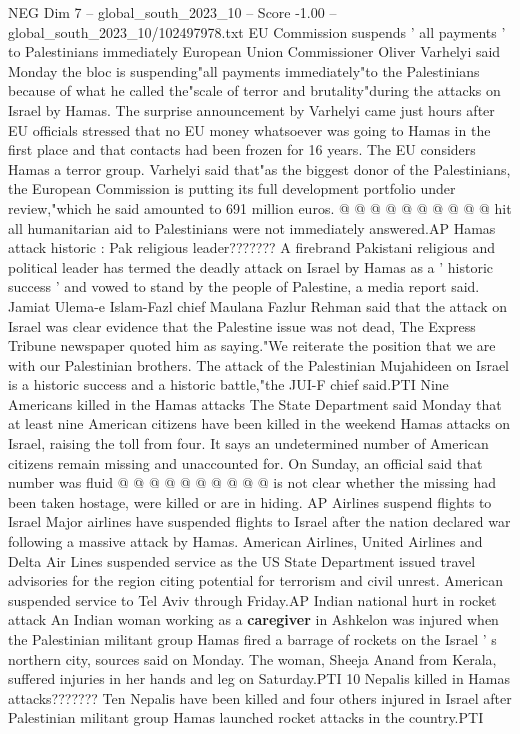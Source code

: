 \begin{textsample}{NEG Dim 7 – global\_south\_2023\_10 – Score -1.00 – global\_south\_2023\_10/102497978.txt}
EU Commission suspends ' all payments ' to Palestinians immediately European Union Commissioner Oliver Varhelyi said Monday the bloc is suspending"all payments immediately"to the Palestinians because of what he called the"scale of terror and brutality"during the attacks on Israel by Hamas.
The surprise announcement by Varhelyi came just hours after EU officials stressed that no EU money whatsoever was going to Hamas in the first place and that contacts had been frozen for 16 years.
The EU considers Hamas a terror group.
Varhelyi said that"as the biggest donor of the Palestinians, the European Commission is putting its full development portfolio under review,"which he said amounted to 691 million euros. @ @ @ @ @ @ @ @ @ @ hit all humanitarian aid to Palestinians were not immediately answered.AP Hamas attack historic : Pak religious leader???????
A firebrand Pakistani religious and political leader has termed the deadly attack on Israel by Hamas as a ' historic success ' and vowed to stand by the people of Palestine, a media report said.
Jamiat Ulema-e Islam-Fazl chief Maulana Fazlur Rehman said that the attack on Israel was clear evidence that the Palestine issue was not dead, The Express Tribune newspaper quoted him as saying."We reiterate the position that we are with our Palestinian brothers.
The attack of the Palestinian Mujahideen on Israel is a historic success and a historic battle,"the JUI-F chief said.PTI Nine Americans killed in the Hamas attacks The State Department said Monday that at least nine American citizens have been killed in the weekend Hamas attacks on Israel, raising the toll from four.
It says an undetermined number of American citizens remain missing and unaccounted for.
On Sunday, an official said that number was fluid @ @ @ @ @ @ @ @ @ @ is not clear whether the missing had been taken hostage, were killed or are in hiding.
AP Airlines suspend flights to Israel Major airlines have suspended flights to Israel after the nation declared war following a massive attack by Hamas.
American Airlines, United Airlines and Delta Air Lines suspended service as the US State Department issued travel advisories for the region citing potential for terrorism and civil unrest.
American suspended service to Tel Aviv through Friday.AP Indian national hurt in rocket attack An Indian woman working as a \textbf{caregiver} in Ashkelon was injured when the Palestinian militant group Hamas fired a barrage of rockets on the Israel ' s northern city, sources said on Monday.
The woman, Sheeja Anand from Kerala, suffered injuries in her hands and leg on Saturday.PTI 10 Nepalis killed in Hamas attacks???????
Ten Nepalis have been killed and four others injured in Israel after Palestinian militant group Hamas launched rocket attacks in the country.PTI

\end{textsample}
